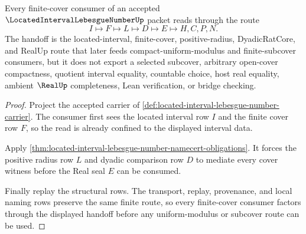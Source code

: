 \begin{theorem}
\label{thm:located-interval-lebesgue-number-finite-cover-handoff}
Every finite-cover consumer of an accepted $\LocatedIntervalLebesgueNumberUp$ packet reads through the route
$$
I \longmapsto F \longmapsto L \longmapsto D \longmapsto E \longmapsto H,C,P,N .
$$
The handoff is the located-interval, finite-cover, positive-radius, DyadicRatCore, and RealUp route that later feeds compact-uniform-modulus and finite-subcover consumers, but it does not export a selected subcover, arbitrary open-cover compactness, quotient interval equality, countable choice, host real equality, ambient $\RealUp$ completeness, Lean verification, or bridge checking.
\end{theorem}
\begin{proof}
Project the accepted carrier of \autoref{def:located-interval-lebesgue-number-carrier}. The consumer first sees the located interval row $I$ and the finite cover row $F$, so the read is already confined to the displayed interval data.

Apply \autoref{thm:located-interval-lebesgue-number-namecert-obligations}. It forces the positive radius row $L$ and dyadic comparison row $D$ to mediate every cover witness before the Real seal $E$ can be consumed.

Finally replay the structural rows. The transport, replay, provenance, and local naming rows preserve the same finite route, so every finite-cover consumer factors through the displayed handoff before any uniform-modulus or subcover route can be used.
\end{proof}


\begin{closurestatus}{\LocatedIntervalLebesgueNumberUp}
  \theoryclosure{\seedClosure}
  \formalstatus{\unformalizedV}
\end{closurestatus}
